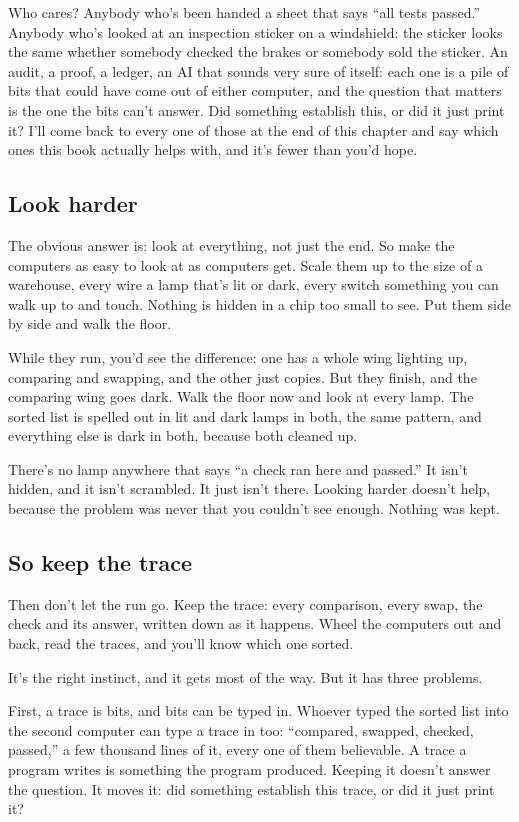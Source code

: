 \documentclass[11pt,twoside]{article}
\theoremstyle{thielethm}
\theoremstyle{thieledef}
\theoremstyle{thieledef}
\theoremstyle{thieledef}
\theoremstyle{thielethm}
\theoremstyle{thieleobs}
\theoremstyle{thielethm}
\begin{document}
Who cares? Anybody who's been handed a sheet that says ``all tests passed.'' Anybody who's looked at an inspection sticker on a windshield: the sticker looks the same whether somebody checked the brakes or somebody sold the sticker. An audit, a proof, a ledger, an AI that sounds very sure of itself: each one is a pile of bits that could have come out of either computer, and the question that matters is the one the bits can't answer. Did something establish this, or did it just print it? I'll come back to every one of those at the end of this chapter and say which ones this book actually helps with, and it's fewer than you'd hope.

\subsection{Look harder}

The obvious answer is: look at everything, not just the end. So make the computers as easy to look at as computers get. Scale them up to the size of a warehouse, every wire a lamp that's lit or dark, every switch something you can walk up to and touch. Nothing is hidden in a chip too small to see. Put them side by side and walk the floor.

While they run, you'd see the difference: one has a whole wing lighting up, comparing and swapping, and the other just copies. But they finish, and the comparing wing goes dark. Walk the floor now and look at every lamp. The sorted list is spelled out in lit and dark lamps in both, the same pattern, and everything else is dark in both, because both cleaned up.

There's no lamp anywhere that says ``a check ran here and passed.'' It isn't hidden, and it isn't scrambled. It just isn't there. Looking harder doesn't help, because the problem was never that you couldn't see enough. Nothing was kept.

\subsection{So keep the trace}

Then don't let the run go. Keep the trace: every comparison, every swap, the check and its answer, written down as it happens. Wheel the computers out and back, read the traces, and you'll know which one sorted.

It's the right instinct, and it gets most of the way. But it has three problems.

First, a trace is bits, and bits can be typed in. Whoever typed the sorted list into the second computer can type a trace in too: ``compared, swapped, checked, passed,'' a few thousand lines of it, every one of them believable. A trace a program writes is something the program produced. Keeping it doesn't answer the question. It moves it: did something establish this trace, or did it just print it?
\end{document}
